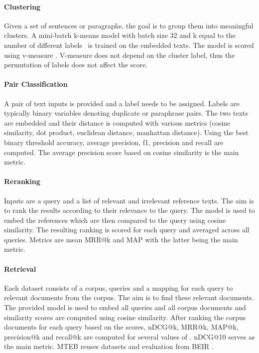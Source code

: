 \documentclass[11pt]{article}
\begin{document}
\paragraph{Clustering} Given a set of sentences or paragraphs, the goal is to group them into meaningful clusters. A mini-batch k-means model with batch size 32 and k equal to the number of different labels~\cite{scikit-learn} is trained on the embedded texts. The model is scored using v-measure \cite{vmeasure}. V-measure does not depend on the cluster label, thus the permutation of labels does not affect the score.

\paragraph{Pair Classification} A pair of text inputs is provided and a label needs to be assigned. Labels are typically binary variables denoting duplicate or paraphrase pairs. The two texts are embedded and their distance is computed with various metrics (cosine similarity, dot product, euclidean distance, manhattan distance). Using the best binary threshold accuracy, average precision, f1, precision and recall are computed. The average precision score based on cosine similarity is the main metric.

\paragraph{Reranking} Inputs are a query and a list of relevant and irrelevant reference texts. The aim is to rank the results according to their relevance to the query. The model is used to embed the references which are then compared to the query using cosine similarity. The resulting ranking is scored for each query and averaged across all queries. Metrics are mean MRR@k and MAP with the latter being the main metric.

\paragraph{Retrieval} Each dataset consists of a corpus, queries and a mapping for each query to relevant documents from the corpus. The aim is to find these relevant documents. The provided model is used to embed all queries and all corpus documents and similarity scores are computed using cosine similarity. After ranking the corpus documents for each query based on the scores, nDCG@k, MRR@k, MAP@k, precision@k and recall@k are computed for several values of . nDCG@10 serves as the main metric. MTEB reuses datasets and evaluation from BEIR \cite{beir}.
\end{document}
